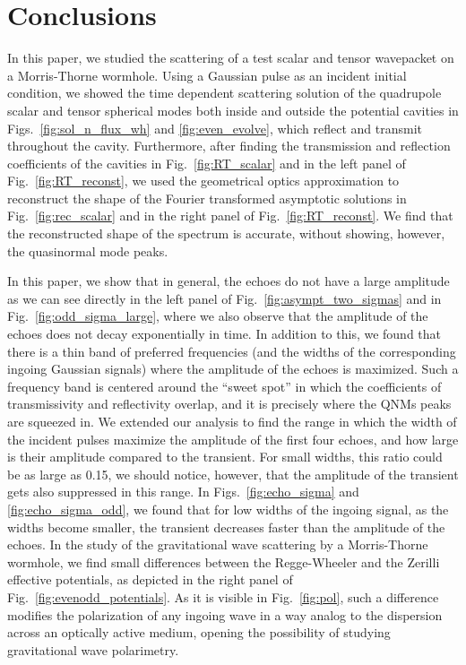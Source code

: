 \documentclass[article,aps,nofootinbib,twocolumn,superscriptaddress]{revtex4-1}
\begin{document}
\section{Conclusions}\label{sec:conclusions}
In this paper, we studied the scattering of a test scalar and tensor wavepacket on a Morris-Thorne wormhole. Using a Gaussian pulse as an incident initial condition, we showed the time dependent scattering solution of the quadrupole scalar and tensor spherical modes both inside and outside the potential cavities in Figs.~\ref{fig:sol_n_flux_wh} and \ref{fig:even_evolve}, which reflect and transmit throughout the cavity. Furthermore, after finding the transmission and reflection coefficients of the cavities in Fig.~\ref{fig:RT_scalar} and in the left panel of Fig.~\ref{fig:RT_reconst}, we used the geometrical optics approximation to reconstruct the shape of the Fourier transformed asymptotic solutions in Fig.~\ref{fig:rec_scalar} and in the right panel of Fig.~\ref{fig:RT_reconst}. We find that the reconstructed shape of the spectrum is accurate, without showing, however, the quasinormal mode peaks.

In this paper, we show that in general, the echoes do not have a large amplitude as we can see directly in the left panel of Fig.~\ref{fig:asympt_two_sigmas} and in Fig.~\ref{fig:odd_sigma_large}, where we also observe that the amplitude of the echoes does not decay exponentially in time. In addition to this, we found that there is a thin band of preferred frequencies (and the widths of the corresponding ingoing Gaussian signals) where the amplitude of the echoes is maximized. Such a frequency band is centered around the ``sweet spot'' in which the coefficients of transmissivity and reflectivity overlap, and it is precisely where the QNMs peaks are squeezed in. We extended our analysis to find the range in which the width of the incident pulses maximize the amplitude of the first four echoes, and how large is their amplitude compared to the transient. For small widths, this ratio could be as large as 0.15, we should notice, however, that the amplitude of the transient gets also suppressed in this range. In Figs.~\ref{fig:echo_sigma} and \ref{fig:echo_sigma_odd}, we found that for low widths of the ingoing signal, as the widths become smaller, the transient decreases faster than the amplitude of the echoes. In the study of the gravitational wave scattering by a Morris-Thorne wormhole, we find small differences between the Regge-Wheeler and the Zerilli effective potentials, as depicted in the right panel of Fig.~\ref{fig:evenodd_potentials}. As it is visible in Fig.~\ref{fig:pol}, such a difference modifies the polarization of any ingoing wave in a way analog to the dispersion across an optically active medium, opening the possibility of studying gravitational wave polarimetry.   
\end{document}
